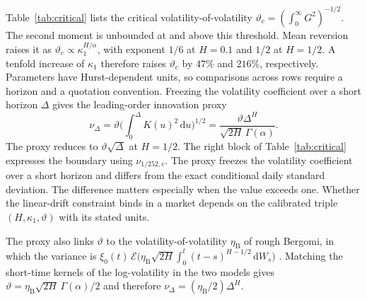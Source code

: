 \documentclass[11pt,a4paper]{article}
\theoremstyle{definition}
\newcommand{\D}{\mathrm{d}}
\begin{document}
Table~\ref{tab:critical} lists the critical volatility-of-volatility $\vartheta_c=(\int_0^\infty G^2)^{-1/2}$. The second moment is unbounded at and above this threshold. Mean reversion raises it as $\vartheta_c\propto\kappa_1^{H/\alpha}$, with exponent $1/6$ at $H=0.1$ and $1/2$ at $H=1/2$. A tenfold increase of $\kappa_1$ therefore raises $\vartheta_c$ by $47\%$ and $216\%$, respectively. Parameters have Hurst-dependent units, so comparisons across rows require a horizon and a quotation convention. Freezing the volatility coefficient over a short horizon $\Delta$ gives the leading-order innovation proxy
\begin{equation*}
\nu_\Delta=\vartheta\Big(\int_0^\Delta K(u)^2\,\D u\Big)^{1/2}
=\frac{\vartheta\Delta^H}{\sqrt{2H}\,\Gamma(\alpha)}.
\end{equation*}
The proxy reduces to $\vartheta\sqrt\Delta$ at $H=1/2$. The right block of Table~\ref{tab:critical} expresses the boundary using $\nu_{1/252,c}$. The proxy freezes the volatility coefficient over a short horizon and differs from the exact conditional daily standard deviation. The difference matters especially when the value exceeds one. Whether the linear-drift constraint binds in a market depends on the calibrated triple $(H,\kappa_1,\vartheta)$ with its stated units.

The proxy also links $\vartheta$ to the volatility-of-volatility $\eta_{\mathrm{B}}$ of rough Bergomi, in which the variance is $\xi_0(t)\,\mathcal{E}\big(\eta_{\mathrm{B}}\sqrt{2H}\int_0^t(t-s)^{H-1/2}\,\D W_s\big)$ \citep{BayerFrizGatheral2016}. Matching the short-time kernels of the log-volatility in the two models gives $\vartheta=\eta_{\mathrm{B}}\sqrt{2H}\,\Gamma(\alpha)/2$ and therefore $\nu_\Delta=(\eta_{\mathrm{B}}/2)\Delta^H$.
\end{document}
